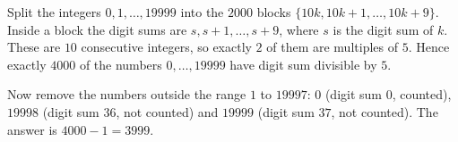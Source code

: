 Split the integers $0,1,\dots,19999$ into the $2000$ blocks $\{10k,10k+1,\dots,10k+9\}$. Inside a block the digit sums are $s,s+1,\dots,s+9$, where $s$ is the digit sum of $k$. These are $10$ consecutive integers, so exactly $2$ of them are multiples of $5$. Hence exactly $4000$ of the numbers $0,\dots,19999$ have digit sum divisible by $5$.

Now remove the numbers outside the range $1$ to $19997$: $0$ (digit sum $0$, counted), $19998$ (digit sum $36$, not counted) and $19999$ (digit sum $37$, not counted). The answer is $4000-1=\boxed{3999}$.
